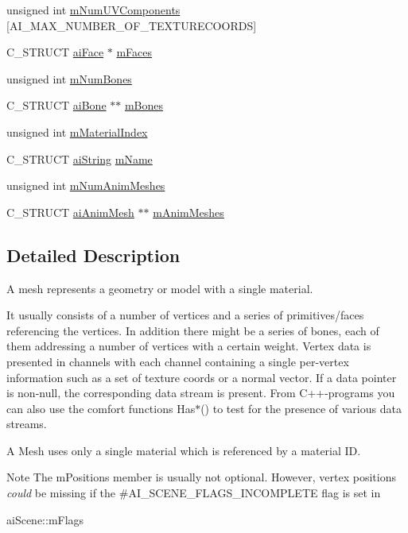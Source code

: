 \begin{DoxyCompactItemize}
\item 
unsigned int \hyperlink{structai_mesh_a635c631a6e66d32989d6b25b2a892d86}{m\-Num\-U\-V\-Components} \mbox{[}A\-I\-\_\-\-M\-A\-X\-\_\-\-N\-U\-M\-B\-E\-R\-\_\-\-O\-F\-\_\-\-T\-E\-X\-T\-U\-R\-E\-C\-O\-O\-R\-D\-S\mbox{]}
\item 
C\-\_\-\-S\-T\-R\-U\-C\-T \hyperlink{structai_face}{ai\-Face} $\ast$ \hyperlink{structai_mesh_a5a65fbc7fdea7f8d36f39047425ece07}{m\-Faces}
\item 
unsigned int \hyperlink{structai_mesh_a0f9d5425b6300e32a842a94f943fd79e}{m\-Num\-Bones}
\item 
C\-\_\-\-S\-T\-R\-U\-C\-T \hyperlink{structai_bone}{ai\-Bone} $\ast$$\ast$ \hyperlink{structai_mesh_a0c0582a7f45b340b6a33552c53232539}{m\-Bones}
\item 
unsigned int \hyperlink{structai_mesh_aa2807c7ba172115203ed16047ad65f9e}{m\-Material\-Index}
\item 
C\-\_\-\-S\-T\-R\-U\-C\-T \hyperlink{structai_string}{ai\-String} \hyperlink{structai_mesh_a8dd9433e0c5b008e3e5aee6c801d3b74}{m\-Name}
\item 
unsigned int \hyperlink{structai_mesh_a1692a300222b32348ae51779df4a697e}{m\-Num\-Anim\-Meshes}
\item 
C\-\_\-\-S\-T\-R\-U\-C\-T \hyperlink{structai_anim_mesh}{ai\-Anim\-Mesh} $\ast$$\ast$ \hyperlink{structai_mesh_a5078f7db7e99ed05db89dfa412f0e990}{m\-Anim\-Meshes}
\end{DoxyCompactItemize}


\subsection{Detailed Description}
A mesh represents a geometry or model with a single material. 

It usually consists of a number of vertices and a series of primitives/faces referencing the vertices. In addition there might be a series of bones, each of them addressing a number of vertices with a certain weight. Vertex data is presented in channels with each channel containing a single per-\/vertex information such as a set of texture coords or a normal vector. If a data pointer is non-\/null, the corresponding data stream is present. From C++-\/programs you can also use the comfort functions Has$\ast$() to test for the presence of various data streams.

A Mesh uses only a single material which is referenced by a material I\-D. \begin{DoxyNote}{Note}
The m\-Positions member is usually not optional. However, vertex positions {\itshape could} be missing if the \#\-A\-I\-\_\-\-S\-C\-E\-N\-E\-\_\-\-F\-L\-A\-G\-S\-\_\-\-I\-N\-C\-O\-M\-P\-L\-E\-T\-E flag is set in 
\begin{DoxyCode}
aiScene::mFlags
\end{DoxyCode}
 
\end{DoxyNote}


